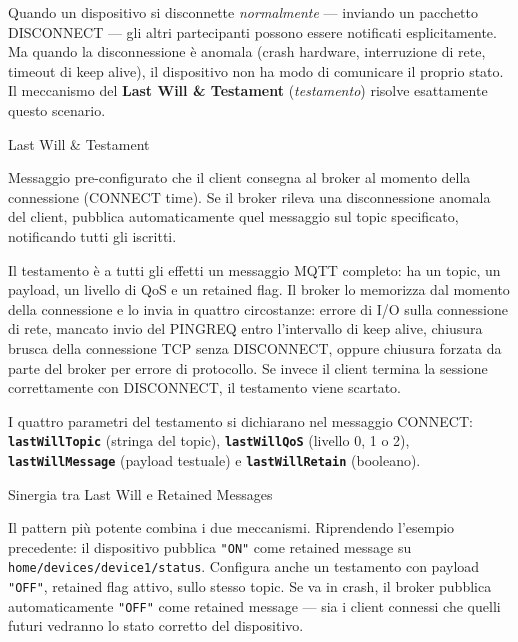 \documentclass[
  italian,
  openany]{book}
\begin{document}
Quando un dispositivo si disconnette \emph{normalmente} --- inviando un
pacchetto DISCONNECT --- gli altri partecipanti possono essere
notificati esplicitamente. Ma quando la disconnessione è anomala (crash
hardware, interruzione di rete, timeout di keep alive), il dispositivo
non ha modo di comunicare il proprio stato. Il meccanismo del
\textbf{Last Will \& Testament} (\emph{testamento}) risolve esattamente
questo scenario.

\begin{calloutdefinition}{Last Will \& Testament}

Messaggio pre-configurato che il client consegna al broker al momento
della connessione (CONNECT time). Se il broker rileva una disconnessione
anomala del client, pubblica automaticamente quel messaggio sul topic
specificato, notificando tutti gli iscritti.

\end{calloutdefinition}

Il testamento è a tutti gli effetti un messaggio MQTT completo: ha un
topic, un payload, un livello di QoS e un retained flag. Il broker lo
memorizza dal momento della connessione e lo invia in quattro
circostanze: errore di I/O sulla connessione di rete, mancato invio del
PINGREQ entro l'intervallo di keep alive, chiusura brusca della
connessione TCP senza DISCONNECT, oppure chiusura forzata da parte del
broker per errore di protocollo. Se invece il client termina la sessione
correttamente con DISCONNECT, il testamento viene scartato.

I quattro parametri del testamento si dichiarano nel messaggio CONNECT:
\textbf{\texttt{lastWillTopic}} (stringa del topic),
\textbf{\texttt{lastWillQoS}} (livello 0, 1 o 2),
\textbf{\texttt{lastWillMessage}} (payload testuale) e
\textbf{\texttt{lastWillRetain}} (booleano).

\begin{callouttip}{Sinergia tra Last Will e Retained Messages}

Il pattern più potente combina i due meccanismi. Riprendendo l'esempio
precedente: il dispositivo pubblica \texttt{"ON"} come retained message
su \texttt{home/devices/device1/status}. Configura anche un testamento
con payload \texttt{"OFF"}, retained flag attivo, sullo stesso topic. Se
va in crash, il broker pubblica automaticamente \texttt{"OFF"} come
retained message --- sia i client connessi che quelli futuri vedranno lo
stato corretto del dispositivo.

\end{callouttip}
\end{document}

